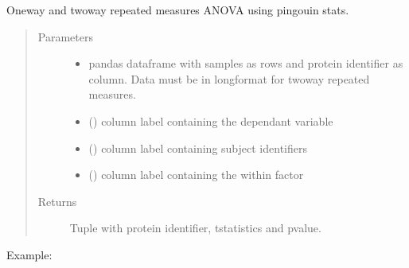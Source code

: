 \documentclass[letterpaper,10pt,english]{sphinxmanual}
\begin{document}
\begin{fulllineitems}
\label{\detokenize{_autosummary/analytics_core.analytics:analytics_core.analytics.analytics.calculate_repeated_measures_anova}}
One\sphinxhyphen{}way and two\sphinxhyphen{}way repeated measures ANOVA using pingouin stats.
\begin{quote}\begin{description}
\item[{Parameters}] \leavevmode\begin{itemize}
\item {} 
 \textendash{} pandas dataframe with samples as rows and protein identifier as column. Data must be in long\sphinxhyphen{}format for two\sphinxhyphen{}way repeated measures.

\item {} 
 () \textendash{} column label containing the dependant variable

\item {} 
 () \textendash{} column label containing subject identifiers

\item {} 
 () \textendash{} column label containing the within factor

\end{itemize}

\item[{Returns}] \leavevmode
Tuple with protein identifier, t\sphinxhyphen{}statistics and p\sphinxhyphen{}value.

\end{description}\end{quote}

Example:

\begin{sphinxVerbatim}[commandchars=\\\{\}]
     
\end{sphinxVerbatim}

\end{fulllineitems}
\end{document}
